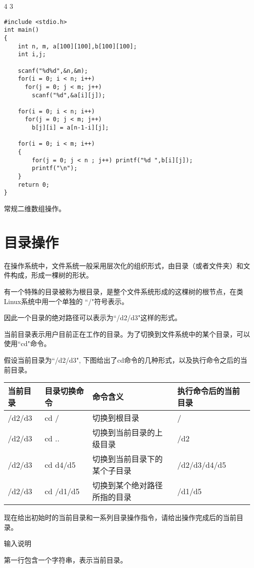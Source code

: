 4 3	

\begin{lstlisting}
#include <stdio.h>
int main()
{
	int n, m, a[100][100],b[100][100];
	int i,j;
	
	scanf("%d%d",&n,&m);
	for(i = 0; i < n; i++)
	  for(j = 0; j < m; j++)
	    scanf("%d",&a[i][j]); 
	
	for(i = 0; i < n; i++)
	  for(j = 0; j < m; j++)
    	b[j][i] = a[n-1-i][j]; 
	
	for(i = 0; i < m; i++)
	{
		for(j = 0; j < n ; j++) printf("%d ",b[i][j]);
		printf("\n");
	}
	return 0;
}
\end{lstlisting}

\begin{note}[要点]
	常规二维数组操作。
\end{note}

\section{目录操作}
在操作系统中，文件系统一般采用层次化的组织形式，由目录（或者文件夹）和文件构成，形成一棵树的形状。

有一个特殊的目录被称为根目录，是整个文件系统形成的这棵树的根节点，在类Linux系统中用一个单独的 ``/"符号表示。

因此一个目录的绝对路径可以表示为``/d2/d3"这样的形式。

当前目录表示用户目前正在工作的目录。为了切换到文件系统中的某个目录，可以使用``cd"命令。

假设当前目录为``/d2/d3", 下图给出了cd命令的几种形式，以及执行命令之后的当前目录。

\begin{tabular}{|l|l|l|l|}
	\hline 
	\textbf{当前目录} & \textbf{目录切换命令} & \textbf{命令含义} & \textbf{执行命令后的当前目录} \\ 
	\hline 
	/d2/d3 & cd / & 切换到根目录 & / \\ 
	\hline 
	/d2/d3 & cd .. & 切换到当前目录的上级目录 & /d2 \\ 
	\hline 
	/d2/d3 & cd d4/d5 & 切换到当前目录下的某个子目录 & /d2/d3/d4/d5 \\ 
	\hline 
	/d2/d3 & cd /d1/d5 & 切换到某个绝对路径所指的目录 & /d1/d5 \\ 
	\hline 
\end{tabular} 

现在给出初始时的当前目录和一系列目录操作指令，请给出操作完成后的当前目录。

输入说明	

第一行包含一个字符串，表示当前目录。

